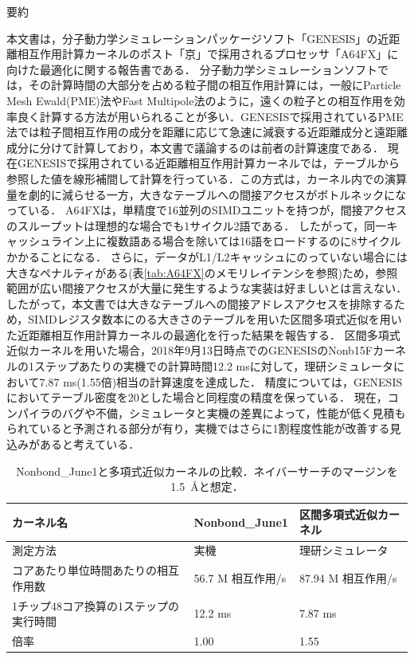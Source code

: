 \documentclass[uplatex,11pt,a4j,titlepage,oneside,openright,dvipdfmx]{jsbook}
\begin{document}
\thispagestyle{empty}
\begin{center}
 {\LARGE 要約}
 \vspace{2.0cm}
\end{center}
本文書は，分子動力学シミュレーションパッケージソフト「GENESIS」の近距離相互作用計算カーネルのポスト「京」で採用されるプロセッサ「A64FX」に向けた最適化に関する報告書である．
分子動力学シミュレーションソフトでは，その計算時間の大部分を占める粒子間の相互作用計算には，一般にParticle Mesh Ewald(PME)法やFast Multipole法のように，遠くの粒子との相互作用を効率良く計算する方法が用いられることが多い．GENESISで採用されているPME法では粒子間相互作用の成分を距離に応じて急速に減衰する近距離成分と遠距離成分に分けて計算しており，本文書で議論するのは前者の計算速度である．
現在GENESISで採用されている近距離相互作用計算カーネルでは，テーブルから参照した値を線形補間して計算を行っている．この方式は，カーネル内での演算量を劇的に減らせる一方，大きなテーブルへの間接アクセスがボトルネックになっている．
A64FXは，単精度で16並列のSIMDユニットを持つが，間接アクセスのスループットは理想的な場合でも1サイクル2語である．
したがって，同一キャッシュライン上に複数語ある場合を除いては16語をロードするのに8サイクルかかることになる．
さらに，データがL1/L2キャッシュにのっていない場合には大きなペナルティがある(表\ref{tab:A64FX}のメモリレイテンシを参照)ため，参照範囲が広い間接アクセスが大量に発生するような実装は好ましいとは言えない．
したがって，本文書では大きなテーブルへの間接アドレスアクセスを排除するため，SIMDレジスタ数本にのる大きさのテーブルを用いた区間多項式近似を用いた近距離相互作用計算カーネルの最適化を行った結果を報告する．
区間多項式近似カーネルを用いた場合，2018年9月13日時点でのGENESISのNonb15Fカーネルの1ステップあたりの実機での計算時間12.2 msに対して，理研シミュレータにおいて7.87 ms(1.55倍)相当の計算速度を達成した．
精度については，GENESISにおいてテーブル密度を20とした場合と同程度の精度を保っている．
現在，コンパイラのバグや不備，シミュレータと実機の差異によって，性能が低く見積もられていると予測される部分が有り，実機ではさらに1割程度性能が改善する見込みがあると考えている．

 \begin{table}[b]
  \centering
  \caption{Nonbond\_June1と多項式近似カーネルの比較．ネイバーサーチのマージンを\mbox{1.5 \AA}と想定．}
  \label{tab:comp}
  \begin{tabular}{l||l|l}
   \hline \hline
   カーネル名 & Nonbond\_June1 & 区間多項式近似カーネル \\ \hline
   測定方法 & 実機 & 理研シミュレータ \\
   コアあたり単位時間あたりの相互作用数 & 56.7 M 相互作用/s & 87.94 M 相互作用/s \\
   1チップ48コア換算の1ステップの実行時間 & 12.2 ms & 7.87 ms\\ \hline
   倍率 & 1.00 & 1.55 \\
   \hline \hline
  \end{tabular}
 \end{table}
\end{document}
